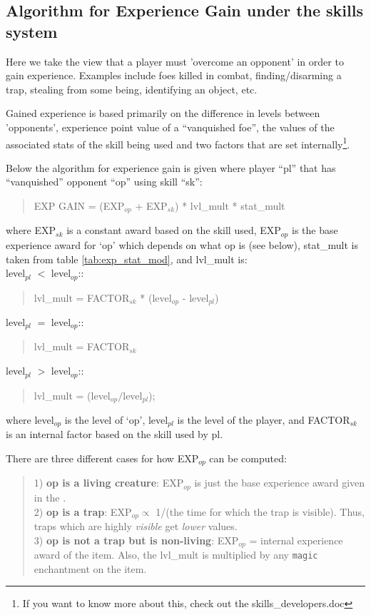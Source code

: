 \subsection{Algorithm for Experience Gain under the skills system}

Here we take the view that a player must 'overcome an opponent'
in order to gain experience. Examples include foes killed in combat,
finding/disarming a trap, stealing from some being, identifying 
an object, etc.

Gained experience is based primarily on the difference in levels 
between 'opponents', experience point value of a ``vanquished foe'', 
the values of the associated stats of the skill being used and 
two factors that are set internally\footnote{If you want to 
know more about this, check out the skills\_developers.doc}.

Below the algorithm for experience gain is given where player ``pl'' 
that has ``vanquished'' opponent ``op'' using skill ``sk'':
\begin{quote}
EXP GAIN = (EXP$_{op}$ + EXP$_{sk}$) * lvl\_mult * stat\_mult
\end{quote}
where EXP$_{sk}$ is a constant award based on the skill used, 
EXP$_{op}$ is the base experience award for `op' which depends
on what op is (see below), 
stat\_mult is taken from table \ref{tab:exp_stat_mod}, 
and lvl\_mult is:\\ 

 level$_{pl}$ $<$ level$_{op}$:: 
\begin{quote}
lvl\_mult = FACTOR$_{sk}$ * (level$_{op}$ - level$_{pl}$)
\end{quote}
 level$_{pl}$ $=$ level$_{op}$:: 
\begin{quote}
lvl\_mult = FACTOR$_{sk}$
\end{quote}
 level$_{pl}$ $>$ level$_{op}$:: 
\begin{quote}
lvl\_mult = (level$_{op}/$level$_{pl}$); 
\end{quote}
where level$_{op}$ is the level of `op', level$_{pl}$ is the level
of the player, and FACTOR$_{sk}$ is an internal factor based on
the skill used by pl.

There are three different cases for how EXP$_{op}$ can be computed:
\begin{quote}
1) {\bf op is a living creature}: EXP$_{op}$ is just the base 
experience award given in the \spoiler . \\

2) {\bf op is a trap}: EXP$_{op} \propto$ 1/(the time for which the
trap is visible). Thus, traps which are highly {\em visible} get {\em lower}
values. \\

3) {\bf op is not a trap but is non-living}: EXP$_{op}$ = internal
experience award of the item. Also, the lvl\_mult is multiplied by
any {\tt magic} enchantment on the item.
\end{quote}

